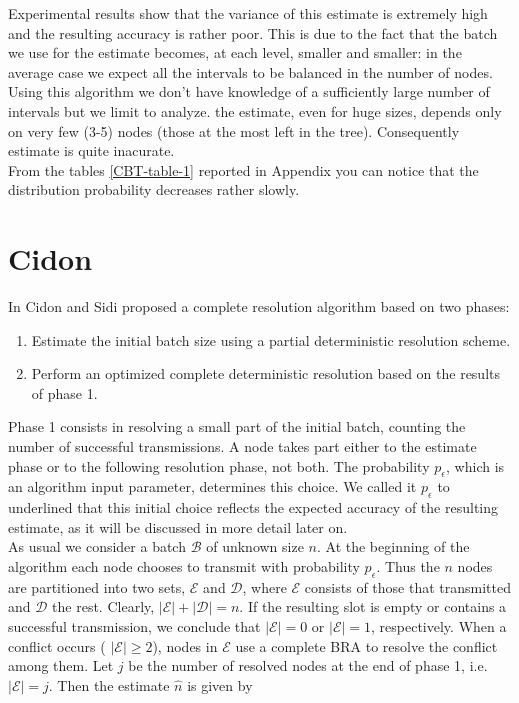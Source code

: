 \documentclass[11pt,a4paper,twoside,openright]{book}
\newcommand{\pc}{p_{\epsilon}}
\begin{document}
Experimental results show that the variance of this estimate is extremely high and the resulting accuracy is rather poor. This is due to the fact that the batch we use for the estimate becomes, at each level, smaller and smaller: in the average case we expect all the intervals to be balanced in the number of nodes. Using this algorithm we don't have knowledge of a sufficiently large number of intervals but we limit to analyze.
the estimate, even for huge sizes, depends only on very few (3-5) nodes (those at the most left in the tree). Consequently estimate is quite inacurate.\\
From the tables  \ref{CBT-table-1} reported in Appendix you can notice that the distribution probability decreases rather slowly.
\section{Cidon}
\label{se:cidon}
In \cite{cidon} Cidon and Sidi proposed a complete resolution algorithm based on two phases:
 
\begin{enumerate}
\item Estimate the initial batch size using a partial deterministic resolution scheme. 
\item Perform an optimized complete deterministic resolution based on the results of phase 1. 
\end{enumerate}

Phase 1 consists in resolving a small part of the initial batch, counting the number of successful transmissions.
A node takes part either to the estimate phase or to the following resolution phase, not both.
The probability $\pc$, which is an algorithm input parameter, determines this choice.
We called it $\pc$ to underlined that this initial choice reflects the expected accuracy of the resulting estimate, as it will be discussed in more detail later on.\\

As usual we consider a batch $\mathcal{B}$ of unknown size $n$.
At the beginning of the algorithm each node chooses to transmit with probability $\pc$. Thus the $n$ nodes are partitioned into two sets, $\mathcal{E}$ and $\mathcal{D}$, where $\mathcal{E}$ consists of those that transmitted and $\mathcal{D}$ the rest. Clearly, $|\mathcal{E}|+|\mathcal{D}|=n$. If the resulting slot is empty or contains a successful transmission, we conclude that $|\mathcal{E}|=0$  or $|\mathcal{E}|=1$, respectively. When a conflict occurs ( $|\mathcal{E}|\geq2$), nodes in $\mathcal{E}$ use a complete BRA to resolve the conflict among them. Let $j$ be the number of resolved nodes at the end of phase 1, i.e. $|\mathcal{E}|=j$. Then the estimate $\hat{n}$ is given by 
\end{document}
